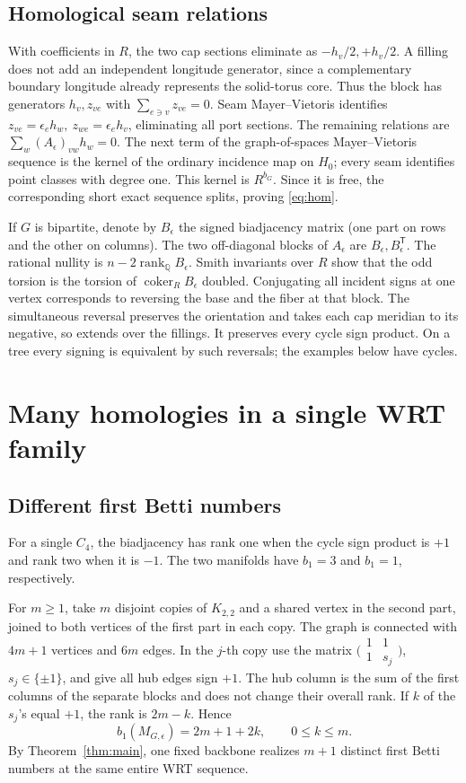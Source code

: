 \documentclass[11pt]{article}
\theoremstyle{remark}
\DeclareMathOperator{\coker}{coker}
\DeclareMathOperator{\rank}{rank}
\begin{document}
\subsection{Homological seam relations}
With coefficients in \(R\), the two cap sections eliminate as \(-h_v/2,+h_v/2\). A filling does not add an independent longitude generator, since a complementary boundary longitude already represents the solid-torus core. Thus the block has generators \(h_v,z_{ve}\) with \(\sum_{e\ni v}z_{ve}=0\). Seam Mayer--Vietoris identifies \(z_{ve}=\epsilon_e h_w,\ z_{we}=\epsilon_e h_v\), eliminating all port sections. The remaining relations are \(\sum_w (A_\epsilon)_{vw}h_w=0\). The next term of the graph-of-spaces Mayer--Vietoris sequence is the kernel of the ordinary incidence map on \(H_0\); every seam identifies point classes with degree one. This kernel is \(R^{b_G}\). Since it is free, the corresponding short exact sequence splits, proving \eqref{eq:hom}.

If \(G\) is bipartite, denote by \(B_\epsilon\) the signed biadjacency matrix (one part on rows and the other on columns). The two off-diagonal blocks of \(A_\epsilon\) are \(B_\epsilon,B_\epsilon^{\mathsf T}\). The rational nullity is \(n-2\rank_{\mathbb Q}B_\epsilon\). Smith invariants over \(R\) show that the odd torsion is the torsion of \(\coker_R B_\epsilon\) doubled. Conjugating all incident signs at one vertex corresponds to reversing the base and the fiber at that block. The simultaneous reversal preserves the orientation and takes each cap meridian to its negative, so extends over the fillings. It preserves every cycle sign product. On a tree every signing is equivalent by such reversals; the examples below have cycles.

\section{Many homologies in a single WRT family}

\subsection{Different first Betti numbers}
For a single \(C_4\), the biadjacency has rank one when the cycle sign product is \(+1\) and rank two when it is \(-1\). The two manifolds have \(b_1=3\) and \(b_1=1\), respectively.

For \(m\ge1\), take \(m\) disjoint copies of \(K_{2,2}\) and a shared vertex in the second part, joined to both vertices of the first part in each copy. The graph is connected with \(4m+1\) vertices and \(6m\) edges. In the \(j\)-th copy use the matrix \(\bigl(\begin{smallmatrix}1&1\\1&s_j\end{smallmatrix}\bigr)\), \(s_j\in\{\pm1\}\), and give all hub edges sign \(+1\). The hub column is the sum of the first columns of the separate blocks and does not change their overall rank. If \(k\) of the \(s_j\)'s equal \(+1\), the rank is \(2m-k\). Hence
\[
             b_1(M_{G,\epsilon})=2m+1+2k,\qquad 0\le k\le m.
\]
By Theorem~\ref{thm:main}, one fixed backbone realizes \(m+1\) distinct first Betti numbers at the same entire WRT sequence.
\end{document}
